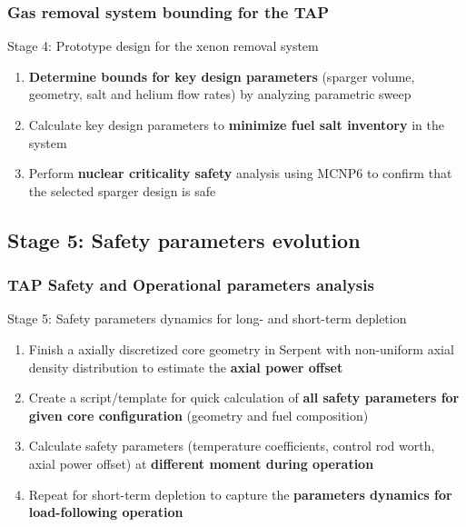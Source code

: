 \begin{frame}
\frametitle{Gas removal system bounding for the TAP}

\begin{block}{Stage 4: Prototype design for the xenon removal system}
	\begin{enumerate}
		\itemsep1em
		\item \textbf{Determine bounds for key design parameters} (sparger 
		volume, geometry, salt and helium flow rates) by analyzing parametric 
		sweep
		\item Calculate key design parameters to \textbf{minimize fuel salt 
		inventory} in the system
		\item Perform \textbf{nuclear criticality safety} analysis using MCNP6 
		\cite{werner_mcnp6._2018} to confirm that the selected sparger design 
		is safe
	\end{enumerate}
\end{block}
\end{frame}


\subsection{Stage 5: Safety parameters evolution}

\begin{frame}
\frametitle{\gls{TAP} Safety and Operational parameters analysis}
		\begin{block}{Stage 5: Safety parameters dynamics for 
		long- and short-term depletion}
	\begin{enumerate}
		\itemsep1em
		\item Finish a axially discretized core	geometry in Serpent with 
		non-uniform axial density distribution to estimate the \textbf{axial 
		power offset}
		\item Create a script/template for quick calculation of \textbf{all 
		safety parameters for given core configuration} (geometry and fuel 
		composition)
		\item Calculate safety parameters (temperature coefficients, control 
		rod worth, axial power offset) at \textbf{different moment during 
		operation}
		\item Repeat for short-term depletion to capture the 
		\textbf{parameters dynamics for load-following operation}
	\end{enumerate}
		\end{block}
\end{frame}


